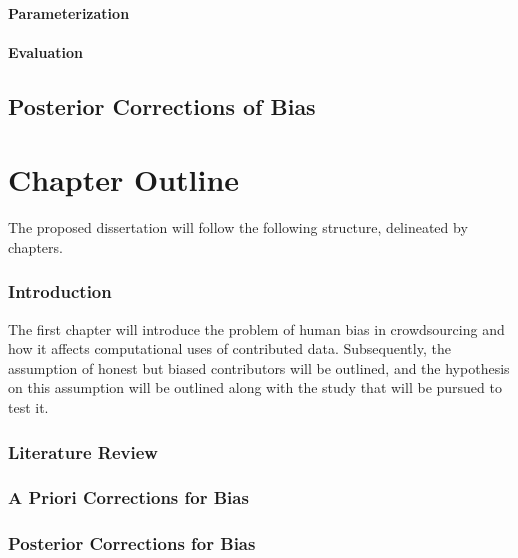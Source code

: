 \paragraph{Parameterization}\label{parameterization}

\paragraph{Evaluation}\label{evaluation}

\subsection{Posterior Corrections of
Bias}\label{posterior-corrections-of-bias}

\section{Chapter Outline}\label{chapter-outline}

The proposed dissertation will follow the following structure,
delineated by chapters.

\subsubsection{Introduction}\label{introduction-3}

The first chapter will introduce the problem of human bias in
crowdsourcing and how it affects computational uses of contributed data.
Subsequently, the assumption of honest but biased contributors will be
outlined, and the hypothesis on this assumption will be outlined along
with the study that will be pursued to test it.

\subsubsection{Literature Review}\label{literature-review}

\subsubsection{A Priori Corrections for
Bias}\label{a-priori-corrections-for-bias}

\subsubsection{Posterior Corrections for
Bias}\label{posterior-corrections-for-bias}
